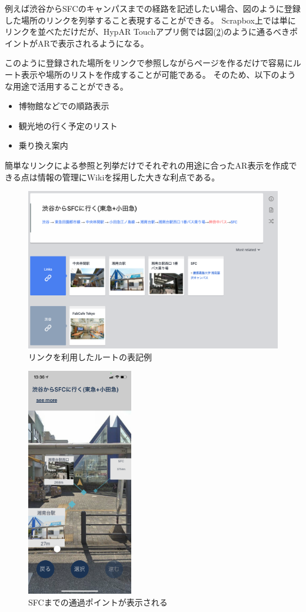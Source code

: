 例えば渋谷からSFCのキャンパスまでの経路を記述したい場合、図のように登録した場所のリンクを列挙すること表現することができる。
Scrapbox上では単にリンクを並べただけだが、HypAR Touchアプリ側では図(\ref{fig:ar_route_sfc})のように通るべきポイントがARで表示されるようになる。

このように登録された場所をリンクで参照しながらページを作るだけで容易にルート表示や場所のリストを作成することが可能である。
そのため、以下のような用途で活用することができる。

\begin{itemize}
  \item 博物館などでの順路表示
  \item 観光地の行く予定のリスト
  \item 乗り換え案内
\end{itemize}

簡単なリンクによる参照と列挙だけでそれぞれの用途に合ったAR表示を作成できる点は情報の管理にWikiを採用した大きな利点である。


\begin{figure}[H]
  \centering
  \includegraphics[width=150mm]{images/route_scrapbox.png}
  \caption{リンクを利用したルートの表記例} \label{fig:route_scrapbox}
\end{figure}

\begin{figure}[H]
  \centering
  \includegraphics[height=100mm]{images/ar_route_sfc.png}
  \caption{SFCまでの通過ポイントが表示される} \label{fig:ar_route_sfc}
\end{figure}



